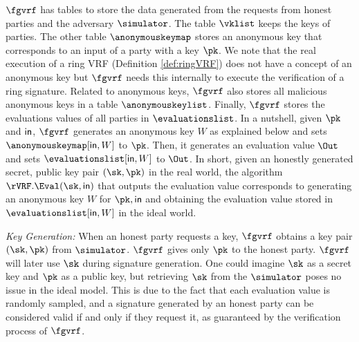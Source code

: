 $ \fgvrf $ has tables to store the data generated from the requests from honest parties and the adversary $ \simulator $. The table $ \vklist $  keeps the keys of parties. The other table  $ \anonymouskeymap $ stores an anonymous key that corresponds to an input  of a party with a key $ \pk $. We note that the real execution of a ring VRF (Definition \ref{def:ringVRF}) does not have a concept of an anonymous key but $ \fgvrf $ needs this internally to execute the verification of a ring signature. Related to anonymous keys, $ \fgvrf $ also stores  all  malicious anonymous keys in a table $ \anonymouskeylist $. Finally, $ \fgvrf $ stores the evaluations values of all parties in $ \evaluationslist $. In a nutshell,  given $ \pk $
and $ \mathsf{in} $, $ \fgvrf $  generates an anonymous key $ W $ as explained below and  sets $ \anonymouskeymap[\msg,W]  $ to $ \pk $. Then, it generates an evaluation value $ \Out $ and sets $ \evaluationslist[\msg,W]  $ to $ \Out $. In short, given an honestly generated secret, public key pair $ (\sk,\pk) $ in the real world, the algorithm
$ \rVRF.\Eval(\sk,\msg) $  that outputs the evaluation value corresponds to generating an anonymous key $ W $ for $ \pk, \msg $ and obtaining the evaluation value stored in $ \evaluationslist[\msg,W] $ in the ideal world. 


\smallskip
	\noindent \textit{Key Generation:}  When an honest party requests  a key, $ \fgvrf $ obtains a key pair $ (\sk, \pk) $ from $ \simulator $. $ \fgvrf $ gives only $ \pk $ to the honest party. $ \fgvrf $ will later use $ \sk $ during signature generation. One could imagine $ \sk $ as a secret key and $ \pk $ as a public key, but retrieving $ \sk $ from the $ \simulator $ poses no issue in the ideal model. This is due to the fact that each evaluation value is randomly sampled, and a signature generated by an honest party can be considered valid if and only if they request it, as guaranteed by the verification process of $\fgvrf$.





